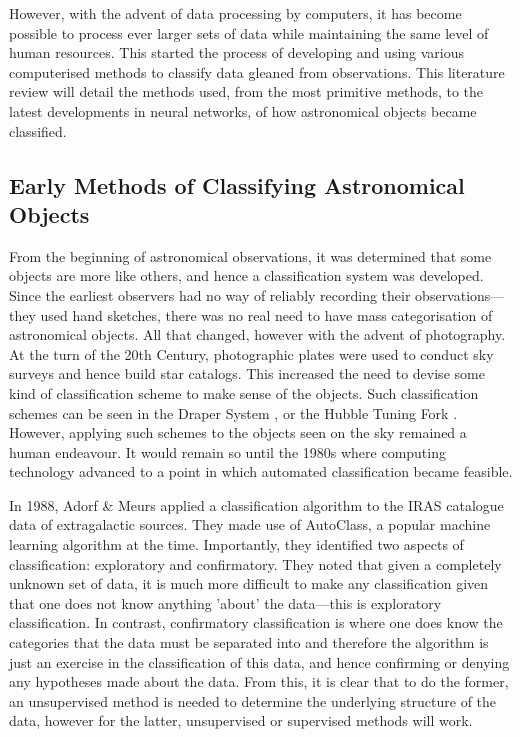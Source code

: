 \documentclass[a4paper,11pt]{article}
\begin{document}
However, with the advent of data processing by computers, it has become possible to process ever larger sets of data while maintaining the same level of human resources. This started the process of developing and using various computerised methods to classify data gleaned from observations. This literature review will detail the methods used, from the most primitive methods, to the latest developments in neural networks, of how astronomical objects became classified.
\subsection{Early Methods of Classifying Astronomical Objects}
From the beginning of astronomical observations, it was determined that some objects are more like others, and hence a classification system was developed. Since the earliest observers had no way of reliably recording their observations—they used hand sketches, there was no real need to have mass categorisation of astronomical objects. All that changed, however with the advent of photography. At the turn of the 20th Century, photographic plates were used to conduct sky surveys and hence build star catalogs. This increased the need to devise some kind of classification scheme to make sense of the objects. Such classification schemes can be seen in the Draper System \cite{russell_1935_the} , or the Hubble Tuning Fork \cite{hubble_1926_extragalactic} . However, applying such schemes to the objects seen on the sky remained a human endeavour. It would remain so until the 1980s where computing technology advanced to a point in which automated classification became feasible.

In 1988, Adorf \& Meurs applied a classification algorithm to the IRAS catalogue data of extragalactic sources.\cite{adorf_1988_supervised}  They made use of AutoClass, a popular machine learning  algorithm at the time. Importantly, they identified two aspects of classification: exploratory and confirmatory. They noted that given a completely unknown set of data, it is much more difficult to make any classification given that one does not know anything 'about' the data—this is exploratory classification. In contrast, confirmatory classification is where one does know the categories that the data must be separated into and therefore the algorithm is just an exercise in the classification of this data, and hence confirming or denying any hypotheses made about the data. From this, it is clear that to do the former, an unsupervised method is needed to determine the underlying structure of the data, however for the latter, unsupervised or supervised methods will work. 
\end{document}
